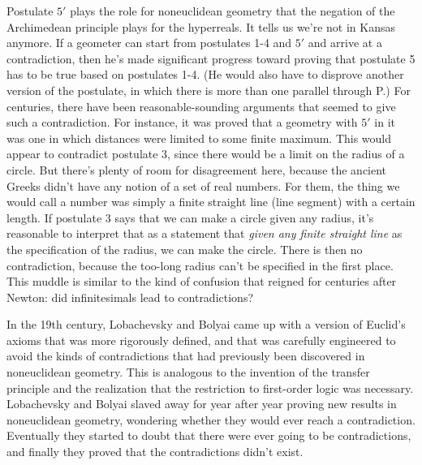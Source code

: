 Postulate $5'$ plays the role for noneuclidean geometry that the negation of the Archimedean principle
plays for the hyperreals. It tells us we're not in Kansas anymore. If a geometer can start from
postulates 1-4 and $5'$ and arrive at a contradiction, then he's made significant progress toward
proving that postulate 5 has to be true based on postulates 1-4. (He would also have to disprove
another version of the postulate, in which there is more than one parallel through P.) For centuries,
there have been reasonable-sounding arguments that seemed to give such a contradiction. For instance,
it was proved that a geometry with $5'$ in it was one in which distances were limited to some finite
maximum. This would appear to contradict postulate 3, since there would be a limit on the radius
of a circle. But there's plenty of room for disagreement here, because the ancient Greeks didn't
have any notion of a set of real numbers. For them, the thing we would call a number was simply a
finite straight line (line segment) with a certain length. If postulate 3 says that we can make a circle given any radius,
it's reasonable to interpret that as a statement that \emph{given any finite straight line} as the
specification of the radius, we can make the circle. There is then no contradiction, because the too-long
radius can't be specified in the first place. This muddle is similar to the kind of confusion that
reigned for centuries after Newton: did infinitesimals lead to contradictions?

In the 19th century, Lobachevsky and Bolyai came up with a version of Euclid's axioms
that was more rigorously defined, and that was carefully engineered to avoid the kinds of
contradictions that had previously been discovered in noneuclidean geometry. This is analogous
to the invention of the transfer principle and the realization that the restriction to first-order
logic was necessary. Lobachevsky and Bolyai slaved away for year after year proving new results
in noneuclidean geometry, wondering whether they would ever reach a contradiction. Eventually they
started to doubt that there were ever going to be contradictions, and finally they proved that
the contradictions didn't exist.

